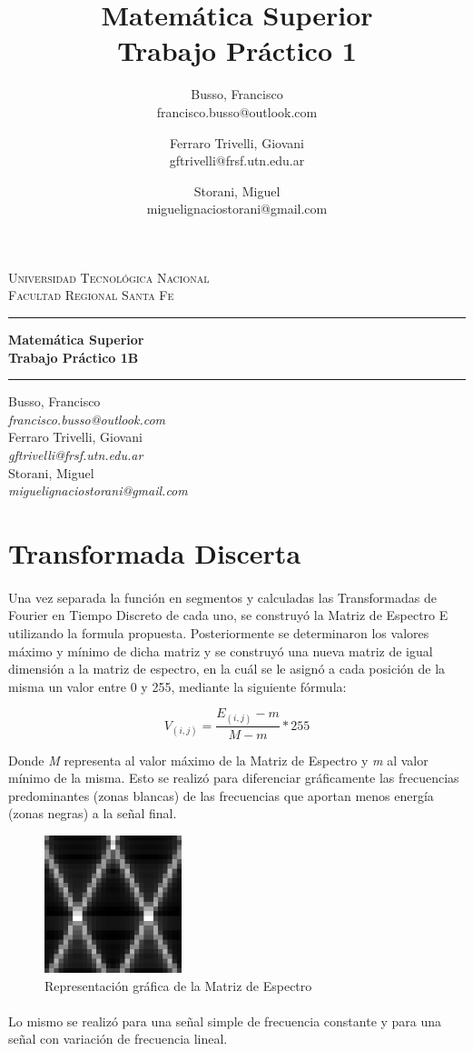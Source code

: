 \documentclass{article}
\title{Matemática Superior\\Trabajo Práctico 1}
\author{ Busso, Francisco\\francisco.busso@outlook.com 
    \and Ferraro Trivelli, Giovani\\gftrivelli@frsf.utn.edu.ar
    \and Storani, Miguel\\ miguelignaciostorani@gmail.com
}
\makeatletter
\renewcommand{\maketitle}{
    \begin{center}
        
        {\scshape{Universidad Tecnológica Nacional\\Facultad Regional Santa Fe}}
        \vspace{10pt}
        \hrule
        \vspace{10pt}
       

        {\LARGE\bfseries{Matemática Superior\\}}
        \vspace{5pt}
        {\Huge\bfseries{Trabajo Práctico 1B}}

        \vspace{8pt}
        \hrule
        \vspace{8pt}

        Busso, Francisco\\
        \textit{francisco.busso@outlook.com}\\
        \vspace{7pt}
        Ferraro Trivelli, Giovani\\
        \textit{gftrivelli@frsf.utn.edu.ar}\\
        \vspace{7pt}
        Storani, Miguel\\
        \textit{miguelignaciostorani@gmail.com}\\

        \thispagestyle{empty}
        
        \newpage
    \end{center}
}
\makeatother
\begin{document}
\maketitle
\newpage

\renewcommand{\contentsname}{Índice}
\tableofcontents
\newpage

    \section{Transformada Discerta}
        \paragraph{}
        Una vez separada la función en segmentos y calculadas las Transformadas de Fourier en Tiempo Discreto de cada uno, 
        se construyó la Matriz de Espectro E utilizando la formula propuesta. Posteriormente se determinaron los valores máximo y mínimo de dicha matriz 
        y se construyó una nueva matriz de igual dimensión a la matriz de espectro, en la cuál se le asignó a cada posición de la misma un valor entre 0 y 255, 
        mediante la siguiente fórmula:

        \begin{equation}
            V_{(i, j)}=\frac{E_{(i, j)}-m}{M-m}*255
        \end{equation}

        Donde \textit{M} representa al valor máximo de la Matriz de Espectro y \textit{m} al valor mínimo de la misma.
        Esto se realizó para diferenciar gráficamente las frecuencias predominantes (zonas  blancas) 
        de las frecuencias que aportan menos energía (zonas negras) a la señal final.

        \begin{figure}[h!]
            \centering
            \includegraphics[width=40mm]{color_img}
            \caption{Representación gráfica de la Matriz de Espectro}
            \label{imagen1}
        \end{figure}

        \paragraph{}
        Lo mismo se realizó para una señal simple de frecuencia constante y para una señal con variación de frecuencia lineal.
\end{document}
